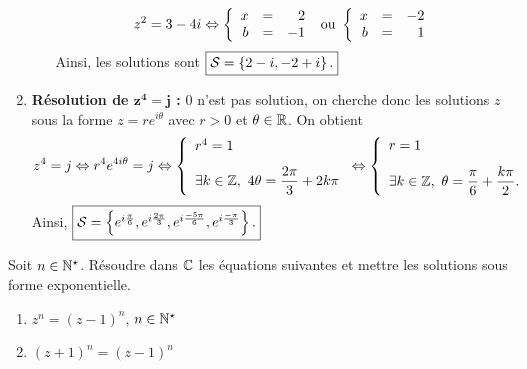 \documentclass[a4paper, 11pt]{article}
\begin{document}
\begin{correction}
\begin{enumerate}
\begin{itemize}
$$z^2=3-4i \Leftrightarrow \left\{\begin{array}{rcr} x&=&2\\b&=&-1\end{array}\right. \textmd{ ou } \left\{\begin{array}{rcr} x&=&-2\\b&=&1\end{array}\right. $$
Ainsi, les solutions sont $\fbox{$ \mathcal{S}=\left\lbrace  2-i, -2+i\right\rbrace .$}$
\end{itemize}
\item \textbf{R\'esolution de $\mathbf{z^4=j}$ :}
0 n'est pas solution, on cherche donc les solutions $z$ sous la forme $z=re^{i\theta}$ avec $r>0$ et $\theta\in\mathbb{R}$. On obtient
$$
z^4=j \Leftrightarrow  r^4e^{4i\theta}=j
\Leftrightarrow  \left\lbrace\begin{array}{l}
r^4=1\vsec\\
\exists k\in\Z,\ 4\theta=\ddp\frac{2\pi}{3}+2k\pi
\end{array}\right.
\Leftrightarrow  \left\lbrace\begin{array}{l}
r=1\vsec\\
\exists k\in\Z,\ \theta=\ddp\frac{\pi}{6}+\ddp\frac{k\pi}{2}.
\end{array}\right.
$$
Ainsi, $\fbox{$ \mathcal{S}=\left\lbrace  e^{i\frac{\pi}{6}},e^{i\frac{2\pi}{3}},e^{i\frac{-5\pi}{6}},e^{i\frac{-\pi}{3}}  \right\rbrace .$}$
\end{enumerate}
\end{correction}









\begin{exercice}  \;
Soit $n\in\mathbb{N}^{\star}$. R\'esoudre dans $\mathbb{C}$ les \'equations suivantes et mettre les solutions sous forme exponentielle.
\begin{enumerate}
\item $z^n=(z-1)^n$, $n\in\mathbb{N}^{\star}$
\item $(z+1)^n=(z-1)^n$ 
\end{enumerate}
\end{exercice}
\end{document}

